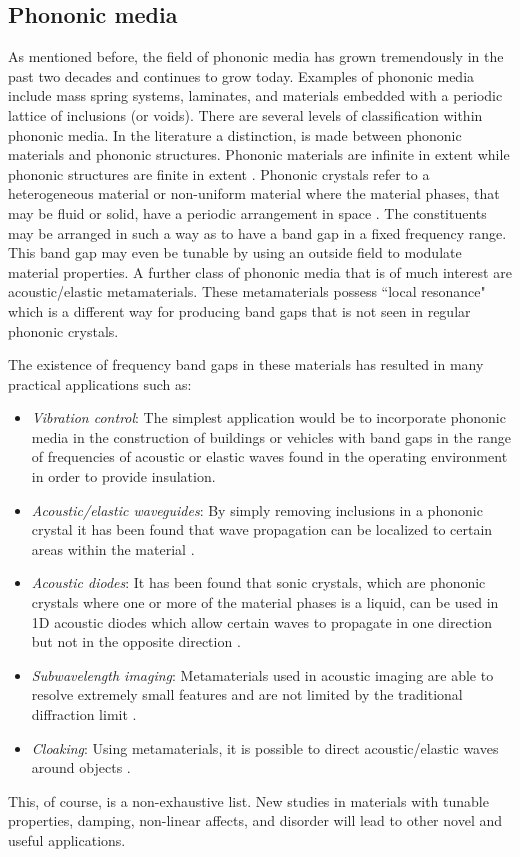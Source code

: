 \documentclass{article}
\begin{document}
\subsection{Phononic media}
As mentioned before, the field of phononic media has grown tremendously in the 
past two decades and continues to grow today. Examples of phononic media 
include mass spring systems, laminates, and materials embedded with a periodic 
lattice of inclusions (or voids). There are several levels of classification 
within phononic media. In the literature a distinction, is made between 
phononic materials and phononic structures. Phononic materials are infinite in 
extent while phononic structures are finite in extent \cite{hussein10}. 
Phononic crystals refer to a heterogeneous material or non-uniform material 
where the material phases, that may be fluid or solid, have a periodic 
arrangement in space \cite{hussein14}. The constituents may be arranged in such 
a way as to have a band gap in a fixed frequency range. This band gap may even 
be tunable by using an outside field to modulate material properties. 
A further class of phononic media that is of much interest are acoustic/elastic 
metamaterials. These metamaterials possess ``local resonance" which is a 
different way for producing band gaps that is not seen in regular phononic 
crystals. 

The existence of frequency band gaps in these materials has resulted in many 
practical applications such as:
\begin{itemize}
	\item \emph{Vibration control}: The simplest application would be to 
	incorporate phononic media in the construction of buildings or 
	vehicles with band gaps in the range of frequencies of acoustic or elastic 
	waves found in the operating environment in order to provide insulation.
	\item \emph{Acoustic/elastic waveguides}: By simply removing inclusions in 
	a phononic crystal it has been found that wave propagation can be localized 
	to certain areas within the material \cite{hou12}. 
	\item \emph{Acoustic diodes}: It has been found that sonic 
	crystals, which are phononic crystals where one or more of the material 
	phases is a liquid, can be used in 1D acoustic diodes which allow certain 
	waves to propagate in one direction but not in the opposite direction 
	\cite{zhang10}.
	\item \emph{Subwavelength imaging}: Metamaterials used in acoustic imaging 
	are able to resolve extremely small features and are not limited by the 
	traditional diffraction limit \cite{sukhovich09}.
	\item \emph{Cloaking}: Using metamaterials, it is possible to direct 
	acoustic/elastic waves around objects \cite{norris11}.
\end{itemize}
This, of course, is a non-exhaustive list. New studies in materials with 
tunable properties, damping, non-linear affects, and disorder will lead to 
other novel and useful applications.
\end{document}
